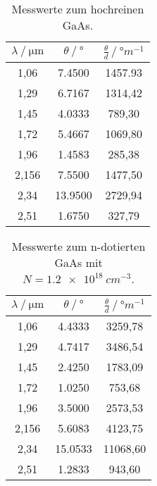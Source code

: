 \begin{table}
  \centering
  \caption{Messwerte zum hochreinen GaAs.}
  \label{tab:rein}
  \begin{tabular}{S[table-format=1.3] S[table-format=2.4] S[table-format=4.2]}
    \toprule
    {$\lambda\:/\:\si{\micro\meter}$} & {$\theta\:/\:\si{\degree}$} & {$\frac{\theta}{d}\:/\:\si{\degree m^{-1}}$} \\
    ,06  & 7.4500  & 1457.93 \\
    1,29  & 6.7167  & 1314,42 \\
    1,45  & 4.0333  & 789,30 \\
    1,72  & 5.4667  & 1069,80 \\
    1,96  & 1.4583  & 285,38 \\
    2,156 & 7.5500  & 1477,50 \\
    2,34  & 13.9500 & 2729,94 \\
    2,51  & 1.6750  & 327,79 \\
    \bottomrule
  \end{tabular}
\end{table}

\begin{table}
  \centering
  \caption{Messwerte zum n-dotierten GaAs mit $N = \SI{1.2e18}{cm^{-3}}$.}
  \label{tab:rein}
  \begin{tabular}{S[table-format=1.3] S[table-format=2.4] S[table-format=5.2]}
    \toprule
    {$\lambda\:/\:\si{\micro\meter}$} & {$\theta\:/\:\si{\degree}$} & {$\frac{\theta}{d}\:/\:\si{\degree m^{-1}}$} \\
    ,06  & 4.4333  & 3259,78 \\
    1,29  & 4.7417  & 3486,54 \\
    1,45  & 2.4250  & 1783,09 \\
    1,72  & 1.0250  & 753,68 \\
    1,96  & 3.5000  & 2573,53 \\
    2,156 & 5.6083  & 4123,75 \\
    2,34  & 15.0533 & 11068,60 \\
    2,51  & 1.2833  & 943,60 \\
    \bottomrule
  \end{tabular}
\end{table}

